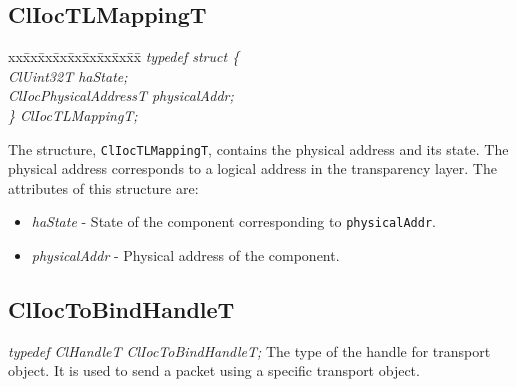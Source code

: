 \begin{flushleft}
\subsection{ClIocTLMappingT}
\begin{tabbing}
xx\=xx\=xx\=xx\=xx\=xx\=xx\=xx\=xx\=\kill
\textit{typedef struct \{}\\
\>\>\>\>\textit{ClUint32T haState;}\\
\>\>\>\>\textit{ClIocPhysicalAddressT physicalAddr;}\\
\textit{\} ClIocTLMappingT;}\end{tabbing}
The structure, {\tt{ClIocTLMappingT}}, contains the physical address and its state. The
physical address corresponds to a logical address in the transparency layer. The attributes of this structure are:
\begin{itemize}
\item
\textit{haState} - State of the component corresponding to {\tt{physicalAddr}}.
\item
\textit{physicalAddr} - Physical address of the component.
\end{itemize}

\subsection{ClIocToBindHandleT}
\textit{typedef ClHandleT ClIocToBindHandleT;}
\newline
\newline
The type of the handle for transport object. It is used to send a packet using a specific transport object.



\end{flushleft}

